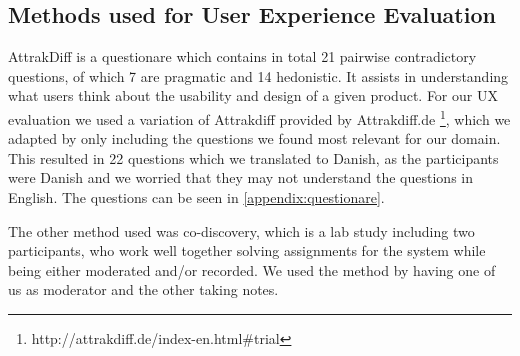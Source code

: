 \subsection{Methods used for User Experience Evaluation}
AttrakDiff is a questionare which contains in total 21 pairwise contradictory questions, of which 7 are pragmatic and 14 hedonistic. It assists in understanding what users think about the usability and design of a given product. For our UX evaluation we used a variation of Attrakdiff provided by Attrakdiff.de \footnote{http://attrakdiff.de/index-en.html$\#$trial}, which we adapted by only including the questions we found most relevant for our domain. This resulted in 22 questions which we translated to Danish, as the participants were Danish and we worried that they may not understand the questions in English. The questions can be seen in \autoref{appendix:questionare}.

The other method used was co-discovery, which is a lab study including two participants, who work well together solving assignments for the system while being either moderated and/or recorded. We used the method by having one of us as moderator and the other taking notes. 